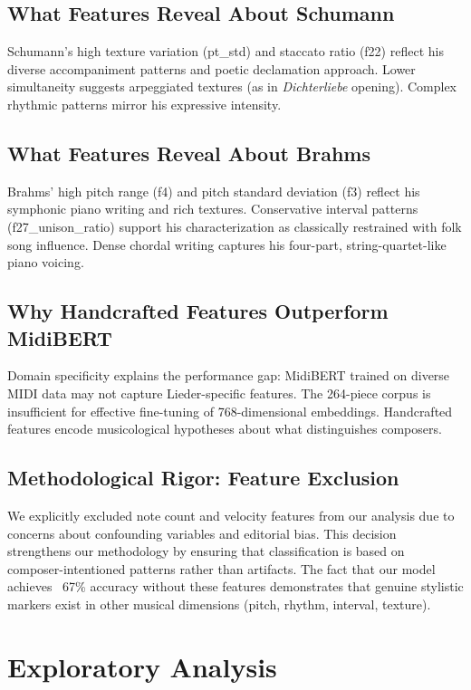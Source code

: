 \documentclass{article}
\begin{document}
\subsection{What Features Reveal About Schumann}

Schumann's high texture variation (pt\_std) and staccato ratio (f22) reflect his diverse accompaniment patterns and poetic declamation approach. Lower simultaneity suggests arpeggiated textures (as in \textit{Dichterliebe} opening). Complex rhythmic patterns mirror his expressive intensity.

\subsection{What Features Reveal About Brahms}

Brahms' high pitch range (f4) and pitch standard deviation (f3) reflect his symphonic piano writing and rich textures. Conservative interval patterns (f27\_unison\_ratio) support his characterization as classically restrained with folk song influence. Dense chordal writing captures his four-part, string-quartet-like piano voicing.

\subsection{Why Handcrafted Features Outperform MidiBERT}

Domain specificity explains the performance gap: MidiBERT trained on diverse MIDI data may not capture Lieder-specific features. The 264-piece corpus is insufficient for effective fine-tuning of 768-dimensional embeddings. Handcrafted features encode musicological hypotheses about what distinguishes composers.

\subsection{Methodological Rigor: Feature Exclusion}

We explicitly excluded note count and velocity features from our analysis due to concerns about confounding variables and editorial bias. This decision strengthens our methodology by ensuring that classification is based on composer-intentioned patterns rather than artifacts. The fact that our model achieves ~67\% accuracy without these features demonstrates that genuine stylistic markers exist in other musical dimensions (pitch, rhythm, interval, texture).

\section{Exploratory Analysis}\label{sec:exploratory}
\end{document}
